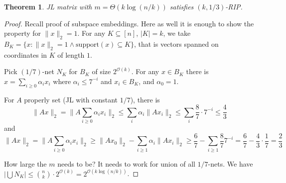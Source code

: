 \documentclass[11pt]{article}
\newtheorem{theorem}{Theorem}
\newcommand{\bigo}{\mathcal{O}}
\begin{document}
\begin{theorem}
JL matrix with $m = \Theta(k \log(n/k))$ satisfies $(k,1/3)$-RIP.
\end{theorem}
\begin{proof}
Recall proof of subspace embeddings. Here as well it is enough to show the property for $\|x\|_2 = 1$. For any $K \subseteq [n]$, $|K| = k$, we take $B_K = \{ x : \|x\|_2 = 1 \wedge \textrm{support}(x) \subseteq K \}$, that is vectors spanned on coordinates in $K$ of length $1$.

Pick $(1/7)$-net $N_K$ for $B_K$ of size $2^{\bigo(k)}$. For any $x \in B_K$ there is
$x = \sum_{i\ge0} \alpha_i x_i $ where $\alpha_i \le 7^{-i}$ and $x_i \in B_K$, and $\alpha_0 = 1$.

For $A$ properly set (JL with constant $1/7$), there is
$$\|Ax\|_2 = \|A \sum_{i\ge0} \alpha_i x_i\|_2 \le \sum_i \alpha_i \|A x_i\|_2 \le \sum_i \frac{8}{7} \cdot 7^{-i} \le \frac{4}{3}$$
and
$$\|Ax\|_2 = \|A \sum_{i\ge0} \alpha_i x_i\|_2 \ge \|A x_0\|_2 - \sum_{i\ge1} \alpha_i \|A x_i\|_2  \ge \frac{6}{7} - \sum_{i\ge1} \frac{8}{7} 7^{-i} = \frac{6}{7} - \frac{4}{3} \cdot \frac{1}{7} = \frac23$$

How large the $m$ needs to be? It needs to work for union of all $1/7$-nets. We have $|\bigcup N_K| \le {n \choose k} \cdot 2^{\bigo(k)} = 2^{\bigo(k \log(n/k))}$.
\end{proof}
\end{document}
